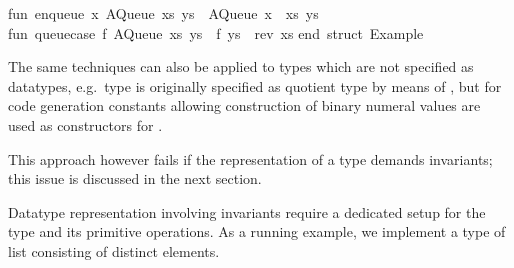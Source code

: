 \begin{isabellebody}
\begin{isamarkuptext}
\isanewline
fun\ enqueue\ x\ {}AQueue\ {}xs{}\ ys{}{}\ {}\ AQueue\ {}x\ {}{}\ xs{}\ ys{}{}\isanewline
\isanewline
fun\ queue{}case\ f\ {}AQueue\ {}xs{}\ ys{}{}\ {}\ f\ {}ys\ {}\ rev\ xs{}{}\isanewline
\isanewline
end{}\ {}{}struct\ Example{}{}\isanewline%
\end{isamarkuptext}%
\isamarkuptrue%
%
\endisatagquotetypewriter
{\isafoldquotetypewriter}%
%
\isadelimquotetypewriter
%
\endisadelimquotetypewriter
%
\begin{isamarkuptext}%
The same techniques can also be applied to types which are not
  specified as datatypes, e.g.~type  is originally specified
  as quotient type by means of \hypertarget{command.typedef}{\hyperlink{command.typedef}{\mbox{}}}, but for code
  generation constants allowing construction of binary numeral values
  are used as constructors for .

  This approach however fails if the representation of a type demands
  invariants; this issue is discussed in the next section.%
\end{isamarkuptext}%
\isamarkuptrue%
%
\isamarkuptrue%
%
\begin{isamarkuptext}%
Datatype representation involving invariants require a dedicated
  setup for the type and its primitive operations.  As a running
  example, we implement a type  of list consisting
  of distinct elements.


\end{isamarkuptext}
\end{isabellebody}
